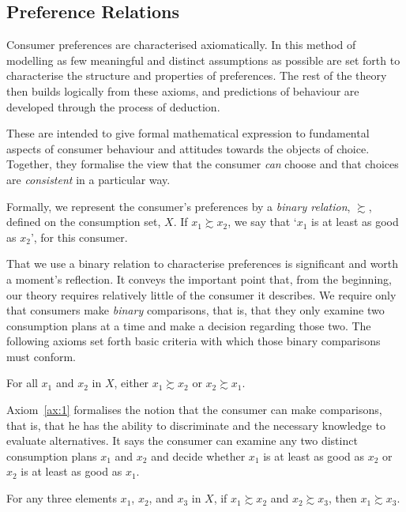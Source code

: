 \documentclass[b5paper]{memoir}
\begin{document}
\subsection{Preference Relations}

Consumer preferences are characterised axiomatically. In this method of modelling as few
meaningful and distinct assumptions as possible are set forth to characterise the
structure and properties of preferences. The rest of the theory then builds logically from
these axioms, and predictions of behaviour are developed through the process of deduction.

These  are intended to give formal mathematical
expression to fundamental aspects of consumer behaviour and attitudes towards the objects
of choice. Together, they formalise the view that the consumer \emph{can} choose and that
choices are \emph{consistent} in a particular way.

Formally, we represent the consumer’s preferences by a \emph{binary relation}, $\succsim$,
defined on the consumption set, $X$. If $x_1 \succsim x_2$, we say that ‘$x_1$ is at least
as good as $x_2$’, for this consumer.

That we use a binary relation to characterise preferences is significant and worth a
moment’s reflection. It conveys the important point that, from the beginning, our theory
requires relatively little of the consumer it describes. We require only that consumers
make \emph{binary} comparisons, that is, that they only examine two consumption plans at a
time and make a decision regarding those two. The following axioms set forth basic
criteria with which those binary comparisons must conform.

\begin{axiom}[Completeness] \label{ax:1}
For all $x_1$ and $x_2$ in $X$, either $x_1 \succsim x_2$ or $x_2 \succsim x_1$.
\end{axiom}

Axiom~\ref{ax:1} formalises the notion that the consumer can make comparisons, that is,
that he has the ability to discriminate and the necessary knowledge to evaluate
alternatives. It says the consumer can examine any two distinct consumption plans $x_1$
and $x_2$ and decide whether $x_1$ is at least as good as $x_2$ or $x_2$ is at least as
good as $x_1$.

\begin{axiom}[Transitivity] \label{ax:2}
For any three elements $x_1$, $x_2$, and $x_3$ in $X$, if $x_1 \succsim x_2$ and $x_2
\succsim x_3$, then $x_1 \succsim x_3$.
\end{axiom}
\end{document}
